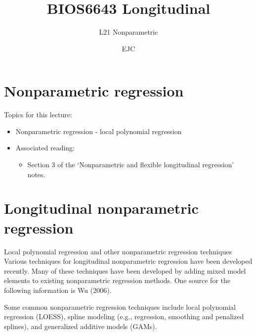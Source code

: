 \documentclass[
  9pt,
  ignorenonframetext,
]{beamer}
\title{BIOS6643 Longitudinal}
\subtitle{L21 Nonparametric}
\author{EJC}
\date{}
\institute{Department of Biostatistics \& Informatics}
\providecommand{\tightlist}{%
  \setlength{\itemsep}{0pt}\setlength{\parskip}{0pt}}
\begin{document}
\frame{\titlepage}

\begin{frame}[allowframebreaks]
  \tableofcontents[hideallsubsections]
\end{frame}
\hypertarget{nonparametric-regression}{%
\section{Nonparametric regression}\label{nonparametric-regression}}

\begin{frame}{Topics for this lecture:}
\protect\hypertarget{topics-for-this-lecture}{}
\begin{itemize}
\tightlist
\item
  Nonparametric regression - local polynomial regression
\end{itemize}

\vspace{\baselineskip}

\begin{itemize}
\item
  Associated reading:

  \begin{itemize}
  \tightlist
  \item
    Section 3 of the `Nonparametric and flexible longitudinal
    regression' notes.
  \end{itemize}
\end{itemize}
\end{frame}

\hypertarget{longitudinal-nonparametric-regression}{%
\section{Longitudinal nonparametric
regression}\label{longitudinal-nonparametric-regression}}

\begin{frame}{Local polynomial regression and other nonparametric
regression techniques}
\protect\hypertarget{local-polynomial-regression-and-other-nonparametric-regression-techniques}{}
Various techniques for longitudinal nonparametric regression have been
developed recently. Many of these techniques have been developed by
adding mixed model elements to existing nonparametric regression
methods. One source for the following information is Wu (2006).

Some common nonparametric regression techniques include local polynomial
regression (LOESS), spline modeling (e.g., regression, smoothing and
penalized splines), and generalized additive models (GAMs).
\end{frame}
\end{document}

